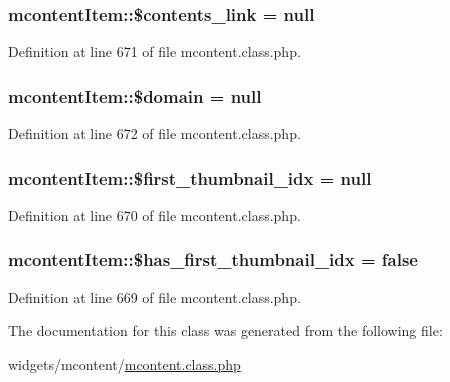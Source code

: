 \hypertarget{classmcontentItem_afdee32faf59897fa7e02f9ed4389b411}{
\subsubsection[{\$contents\+\_\+link}]{\setlength{\rightskip}{0pt plus 5cm}mcontent\+Item\+::\$contents\+\_\+link = null}}\label{classmcontentItem_afdee32faf59897fa7e02f9ed4389b411}


Definition at line 671 of file mcontent.\+class.\+php.

\hypertarget{classmcontentItem_ad92b662d98d23cb2a10747de7ffdada0}{
\subsubsection[{\$domain}]{\setlength{\rightskip}{0pt plus 5cm}mcontent\+Item\+::\$domain = null}}\label{classmcontentItem_ad92b662d98d23cb2a10747de7ffdada0}


Definition at line 672 of file mcontent.\+class.\+php.

\hypertarget{classmcontentItem_a358e826e3ee863300d43b12a8218a5fa}{
\subsubsection[{\$first\+\_\+thumbnail\+\_\+idx}]{\setlength{\rightskip}{0pt plus 5cm}mcontent\+Item\+::\$first\+\_\+thumbnail\+\_\+idx = null}}\label{classmcontentItem_a358e826e3ee863300d43b12a8218a5fa}


Definition at line 670 of file mcontent.\+class.\+php.

\hypertarget{classmcontentItem_a8c95afa6c7bcad64626c9f343e77cdd4}{
\subsubsection[{\$has\+\_\+first\+\_\+thumbnail\+\_\+idx}]{\setlength{\rightskip}{0pt plus 5cm}mcontent\+Item\+::\$has\+\_\+first\+\_\+thumbnail\+\_\+idx = false}}\label{classmcontentItem_a8c95afa6c7bcad64626c9f343e77cdd4}


Definition at line 669 of file mcontent.\+class.\+php.



The documentation for this class was generated from the following file\+:\begin{DoxyCompactItemize}
\item 
widgets/mcontent/\hyperlink{mcontent_8class_8php}{mcontent.\+class.\+php}\end{DoxyCompactItemize}
